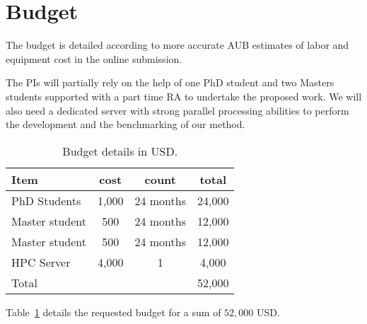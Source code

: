 \section{Budget}

The budget is detailed according to more accurate 
AUB estimates of labor and equipment cost in the online
submission. 

The PIs will partially rely on the help of one PhD student and 
two Masters students supported with a part time RA
to undertake the proposed work.
%
We will also need a dedicated server with strong parallel 
processing abilities to perform the development and
the benchmarking of our method. 

\begin{table}
  \caption{Budget details in USD. } \label{t:budget}
  \begin{center}
  \begin{tabular}{|l||c|c|c|} \hline 
    Item & cost & count & total \\ \hline \hline 
    PhD Students & 1,000 & 24 months & 24,000 \\ 
    Master student & 500 & 24 months & 12,000 \\ 
    Master student & 500 & 24 months & 12,000 \\ 
    HPC Server     & 4,000 & 1       & 4,000 \\ \hline
    Total          &       &         & 52,000 \\ \hline
  \end{tabular}
  \end{center}
\end{table}

Table~\ref{t:budget} details the requested budget for a sum 
of $52,000$ USD. 

